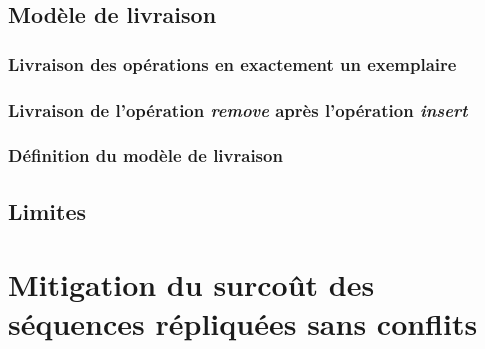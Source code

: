 \documentclass[12pt]{thesul}
\begin{document}
\subsection{Modèle de livraison}


\subsubsection{Livraison des opérations en exactement un exemplaire}


\subsubsection{Livraison de l'opération \emph{remove} après l'opération \emph{insert}}


\subsubsection{Définition du modèle de livraison}


\subsection{Limites}


\section{Mitigation du surcoût des séquences répliquées sans conflits}
\end{document}
